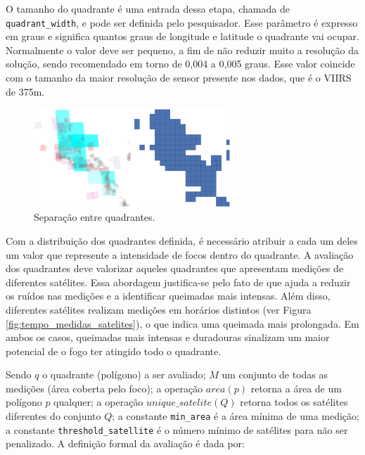 \documentclass[cic,tc]{iiufrgs}
\begin{document}
O tamanho do quadrante é uma entrada dessa etapa, chamada de \texttt{quadrant\_width}, e pode ser definida pelo pesquisador. Esse parâmetro é expresso em graus e significa quantos graus de longitude e latitude o quadrante vai ocupar. Normalmente o valor deve ser pequeno, a fim de não reduzir muito a resolução da solução, sendo recomendado em torno de 0,004 a 0,005 graus. Esse valor coincide com o tamanho da maior resolução de sensor presente nos dados, que é o VIIRS de 375m.

\begin{figure}[H]
    \caption{Separação entre quadrantes.}
    \begin{center}
        \includegraphics[width=20em]{satellite_quads_split}
    \end{center}
    \label{fig:satellite_quads_split}
\end{figure}

Com a distribuição dos quadrantes definida, é necessário atribuir a cada um deles um valor que represente a intensidade de focos dentro do quadrante. A avaliação dos quadrantes deve valorizar aqueles quadrantes que apresentam medições de diferentes satélites. Essa abordagem justifica-se pelo fato de que ajuda a reduzir os ruídos nas medições e a identificar queimadas mais intensas. Além disso, diferentes satélites realizam medições em horários distintos (ver Figura \ref{fig:tempo_medidas_satelites}), o que indica uma queimada mais prolongada. Em ambos os casos, queimadas mais intensas e duradouras sinalizam um maior potencial de o fogo ter atingido todo o quadrante.

Sendo $q$ o quadrante (polígono) a ser avaliado; $M$ um conjunto de todas as medições (área coberta pelo foco); a operação $area(p)$ retorna a área de um polígono $p$ qualquer; a operação $unique\_satelite(Q)$ retorna todos os satélites diferentes do conjunto $Q$; a constante \texttt{min\_area} é a área mínima de uma medição; a constante \texttt{threshold\_satellite} é o número mínimo de satélites para não ser penalizado. A definição formal da avaliação é dada por: \par
\end{document}
